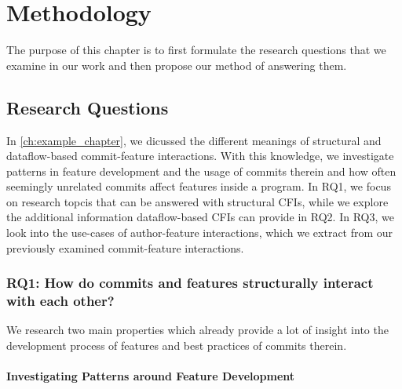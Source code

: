 \chapter{Methodology}\label{ch:methodology}

The purpose of this chapter is to first formulate the research questions that we examine in our work and then propose our method of answering them.

\section{Research Questions}\label{sec:research_questions}

In \autoref{ch:example_chapter}, we dicussed the different meanings of structural and dataflow-based commit-feature interactions.
With this knowledge, we investigate patterns in feature development and the usage of commits therein and how often seemingly unrelated commits affect features inside a program.
In RQ1, we focus on research topcis that can be answered with structural CFIs, while we explore the additional information dataflow-based CFIs can provide in RQ2.
In RQ3, we look into the use-cases of author-feature interactions, which we extract from our previously examined commit-feature interactions.

\subsection[RQ1: How do commits and features structurally interact with each other?]{\textbf{RQ1}: How do commits and features structurally interact with each other?}\label{sec:meth:RQ1}

We research two main properties which already provide a lot of insight into the development process of features and best practices of commits therein.

\subsubsection*{Investigating Patterns around Feature Development}

